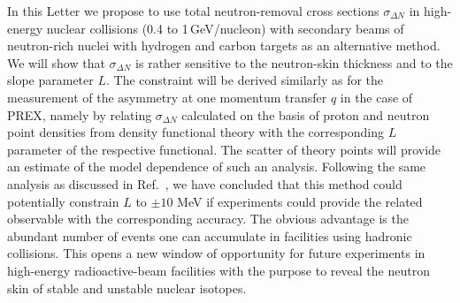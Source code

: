 \documentclass[english,aps,prl,twocolumn,superscriptaddress]{revtex4}
\begin{document}
In this Letter we propose to use total neutron-removal cross sections $\sigma_{\Delta N}$ in high-energy nuclear collisions (0.4 to 1\,GeV/nucleon) with secondary beams of neutron-rich nuclei with hydrogen and carbon targets as an alternative method. We will show that $\sigma_{\Delta N}$ is rather sensitive to the neutron-skin thickness and to the slope parameter $L$. The constraint will be derived similarly as for the measurement of the asymmetry at one momentum transfer $q$ in the case of PREX, namely by relating $\sigma_{\Delta N}$ calculated on the basis of proton and neutron point densities from density functional theory with the corresponding $L$ parameter of the respective functional. The scatter of theory points will provide an estimate of the model dependence of such an analysis. Following the same analysis as discussed in Ref.\ \cite{Roc11}, we have concluded that this method could potentially constrain $L$ to $\pm 10$ MeV if experiments could provide the related observable with the corresponding accuracy. The obvious advantage is the abundant number of events one can accumulate in facilities using hadronic collisions. This opens a new window of opportunity for future experiments in high-energy radioactive-beam facilities with the purpose to reveal the neutron skin of stable and unstable nuclear isotopes.
\end{document}
